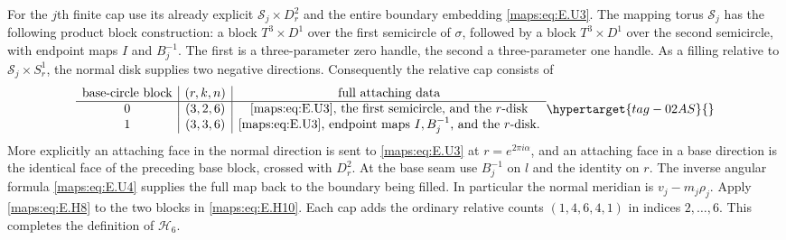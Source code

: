 \begin{theorem}
For the $j$th finite cap use its already explicit
$\mathcal S_j\times D^2_r$ and the entire boundary embedding
\eqref{maps:eq:E.U3}.  The mapping torus $\mathcal S_j$ has the following product
block construction: a block $T^3\times D^1$ over the first
semicircle of $\sigma$, followed by a block $T^3\times D^1$ over
the second semicircle, with endpoint maps $I$ and $B_j^{-1}$.
The first is a three-parameter zero handle, the second a
three-parameter one handle.  As a filling relative to
$\mathcal S_j\times S^1_r$, the normal disk supplies two negative
directions.  Consequently the relative cap consists of
\begin{equation}
 \begin{array}{c|c|c}
 \hbox{base-circle block}&(r,k,n)&\hbox{full attaching data}\\ \hline
 0&(3,2,6)&\hbox{\eqref{maps:eq:E.U3}, the first semicircle, and the $r$-disk}\\
 1&(3,3,6)&\hbox{\eqref{maps:eq:E.U3}, endpoint maps $I,B_j^{-1}$, and the $r$-disk}.
 \end{array}
 \hypertarget{tag-02AS}{}\label{maps:eq:E.H10}
\end{equation}
More explicitly an attaching face in the normal direction is sent
to \eqref{maps:eq:E.U3} at $r=e^{2\pi i\alpha}$, and an attaching face in a
base direction is the identical face of the preceding base block,
crossed with $D^2_r$.  At the base seam use $B_j^{-1}$ on $l$ and
the identity on $r$.  The inverse angular formula \eqref{maps:eq:E.U4} supplies
the full map back to the boundary being filled.  In particular
the normal meridian is $v_j-m_j\rho_j$.
Apply \eqref{maps:eq:E.H8} to the two blocks in \eqref{maps:eq:E.H10}.  Each cap adds the
ordinary relative counts $(1,4,6,4,1)$ in indices $2,\ldots,6$.
This completes the definition of $\mathcal H_6$.


\end{theorem}
